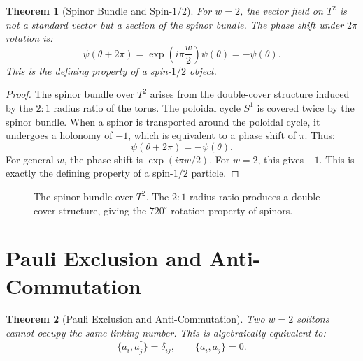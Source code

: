 \documentclass[12pt,oneside]{book}
\newtheorem{theorem}{Theorem}[chapter]
\begin{document}
\begin{theorem}[Spinor Bundle and Spin-$1/2$]
For $w = 2$, the vector field on $T^2$ is not a standard vector but a section of the spinor bundle. The phase shift under $2\pi$ rotation is:
\[
\psi(\theta + 2\pi) = \exp\left(i\pi \frac{w}{2}\right)\psi(\theta) = -\psi(\theta).
\]
This is the defining property of a spin-$1/2$ object.
\end{theorem}

\begin{proof}
The spinor bundle over $T^2$ arises from the double-cover structure induced by the $2:1$ radius ratio of the torus. The poloidal cycle $S^1$ is covered twice by the spinor bundle. When a spinor is transported around the poloidal cycle, it undergoes a holonomy of $-1$, which is equivalent to a phase shift of $\pi$. Thus:
\[
\psi(\theta + 2\pi) = -\psi(\theta).
\]
For general $w$, the phase shift is $\exp(i\pi w/2)$. For $w=2$, this gives $-1$. This is exactly the defining property of a spin-$1/2$ particle.
\end{proof}

\begin{figure}[H]
\centering
{}
\caption{The spinor bundle over $T^2$. The $2:1$ radius ratio produces a double-cover structure, giving the $720^\circ$ rotation property of spinors.}
\label{fig:spinor}
\end{figure}

\section{Pauli Exclusion and Anti-Commutation}

\begin{theorem}[Pauli Exclusion and Anti-Commutation]
Two $w = 2$ solitons cannot occupy the same linking number. This is algebraically equivalent to:
\[
\{a_i, a_j^\dagger\} = \delta_{ij}, \qquad \{a_i, a_j\} = 0.
\]
\end{theorem}
\end{document}
